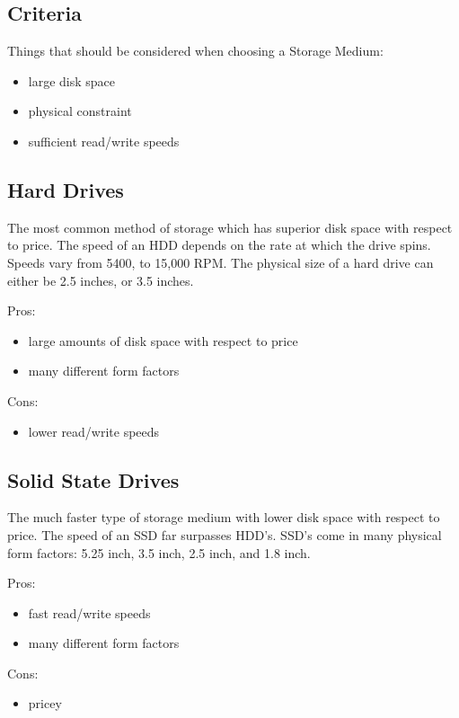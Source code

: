 \documentclass[onecolumn, draftclsnofoot,10pt, compsoc]{IEEEtran}
\begin{document}
\subsection{Criteria}
Things that should be considered when choosing a Storage Medium:

\begin{itemize}
    \item large disk space
    \item physical constraint
    \item sufficient read/write speeds
\end{itemize}

\subsection{Hard Drives}
The most common method of storage which has superior disk space with respect to price. The speed of an HDD depends on the rate at which the drive spins. Speeds vary from 5400, to 15,000 RPM. The physical size of a hard drive can either be 2.5 inches, or 3.5 inches. 


Pros:
\begin{itemize}
    \item large amounts of disk space with respect to price
    \item many different form factors
\end{itemize}

Cons:
\begin{itemize}
    \item lower read/write speeds
\end{itemize}

\subsection{Solid State Drives}
The much faster type of storage medium with lower disk space with respect to price. The speed of an SSD far surpasses HDD's. SSD's come in many physical form factors: 5.25 inch, 3.5 inch, 2.5 inch, and 1.8 inch.

Pros:
\begin{itemize}
    \item fast read/write speeds
    \item many different form factors
\end{itemize}

Cons:
\begin{itemize}
    \item pricey
\end{itemize}
\end{document}
